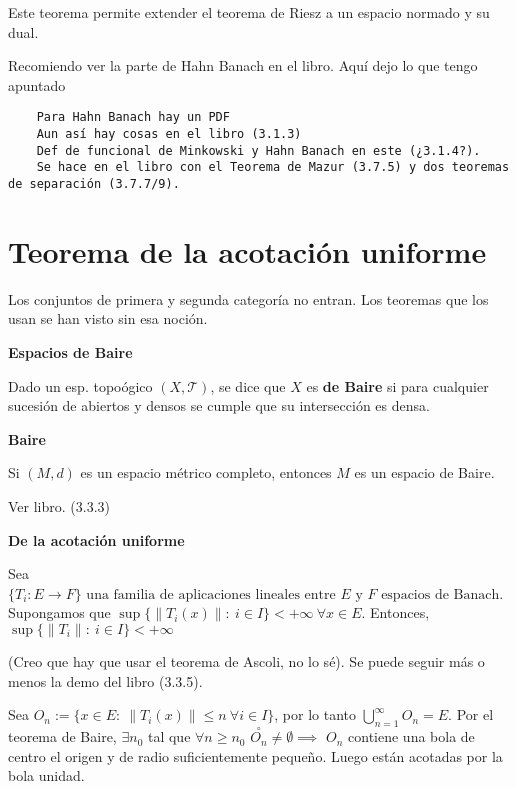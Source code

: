 \documentclass[openany]{book}
\begin{document}
Este teorema permite extender el teorema de Riesz a un espacio normado y su dual.

Recomiendo ver la parte de Hahn Banach en el libro. Aquí dejo lo que tengo apuntado

\begin{Verbatim}
    Para Hahn Banach hay un PDF
    Aun así hay cosas en el libro (3.1.3)
    Def de funcional de Minkowski y Hahn Banach en este (¿3.1.4?).
    Se hace en el libro con el Teorema de Mazur (3.7.5) y dos teoremas de separación (3.7.7/9).

\end{Verbatim}

\section{Teorema de la acotación uniforme}

{\color{red}Los conjuntos de primera y segunda categoría no entran. Los teoremas que los usan se han visto sin esa noción.}

\begin{definition}
    \textbf{Espacios de Baire}

    Dado un esp. topoógico $ (X,\mathcal{T})$, se dice que $ X$ es \textbf{de Baire} si para cualquier sucesión de abiertos y densos se cumple que su intersección es densa.
\end{definition}


\begin{theorem}
    \textbf{Baire}

    Si $ (M,d)$ es un espacio métrico completo, entonces $ M$ es un espacio de Baire.
\end{theorem}

\begin{demonstration}
    Ver libro. (3.3.3)
\end{demonstration}

\begin{theorem}
    \textbf{De la acotación uniforme}

    Sea $ \{T_i: E \to F\} \text{ una familia de aplicaciones lineales entre }E \text{ y } F \text{ espacios de Banach}$. Supongamos que $ \sup \{\|T_i(x)\|:\ i \in I\} < + \infty \ \forall x \in E$. Entonces, $ \sup \{\|T_i\|:\ i \in I\} < + \infty$
\end{theorem}

\begin{demonstration}

    (Creo que hay que usar el teorema de Ascoli, no lo sé). Se puede seguir más o menos la demo del libro (3.3.5).

    Sea $ O_n:= \{x \in E:\ \|T_i(x)\|\leq n \ \forall i \in I\}$, por lo tanto $ \bigcup_{n=1}^{\infty} O_n = E$. Por el teorema de Baire, $ \exists n_0$ tal que $ \forall n \geq  n_0$ $  \stackrel{\circ}{O_n} \ne \emptyset \implies $ $ O_n$ contiene una bola de centro el origen y de radio suficientemente pequeño. Luego están acotadas por la bola unidad.
\end{demonstration}
\end{document}
